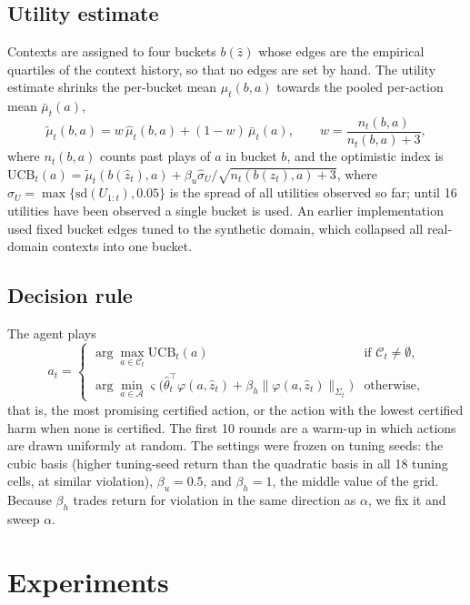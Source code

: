 \documentclass[10pt,a4paper]{article}
\begin{document}
\subsection*{Utility estimate}
Contexts are assigned to four buckets $b(\hat z)$ whose edges are the empirical quartiles of the
context history, so that no edges are set by hand. The utility estimate shrinks the per-bucket mean
$\hat\mu_t(b,a)$ towards the pooled per-action mean $\bar\mu_t(a)$,
\begin{equation}
\tilde\mu_t(b,a)=w\,\hat\mu_t(b,a)+(1-w)\,\bar\mu_t(a),\qquad w=\frac{n_t(b,a)}{n_t(b,a)+3},
\label{eq:shrink}
\end{equation}
where $n_t(b,a)$ counts past plays of $a$ in bucket $b$, and the optimistic index is
$\mathrm{UCB}_t(a)=\tilde\mu_t(b(\hat z_t),a)+\beta_u\hat\sigma_U/\sqrt{n_t(b(\hat z_t),a)+3}$, where $\hat\sigma_U=\max\{\mathrm{sd}(U_{1:t}),0.05\}$ is the spread of all utilities observed so far; until 16 utilities have been observed a single bucket is used. An earlier
implementation used fixed bucket edges tuned to the synthetic domain, which collapsed all real-domain
contexts into one bucket.

\subsection*{Decision rule}
The agent plays
\begin{equation}
a_t=\begin{cases}\arg\max_{a\in\mathcal C_t}\mathrm{UCB}_t(a) & \text{if }\mathcal C_t\neq\emptyset,\\
\arg\min_{a\in\mathcal A}\varsigma\big(\hat\theta_t^\top\varphi(a,\hat z_t)+\beta_h\|\varphi(a,\hat z_t)\|_{\Sigma_t}\big) & \text{otherwise},\end{cases}
\label{eq:rule}
\end{equation}
that is, the most promising certified action, or the action with the lowest certified harm when none is certified. The first 10 rounds are a warm-up in which actions are drawn uniformly at random. The settings were frozen on tuning seeds: the cubic basis (higher tuning-seed return
than the quadratic basis in all 18 tuning cells, at similar violation), $\beta_u=0.5$, and
$\beta_h=1$, the middle value of the grid. Because $\beta_h$ trades return for violation in the same
direction as $\alpha$, we fix it and sweep $\alpha$.

\section*{Experiments}
\end{document}
